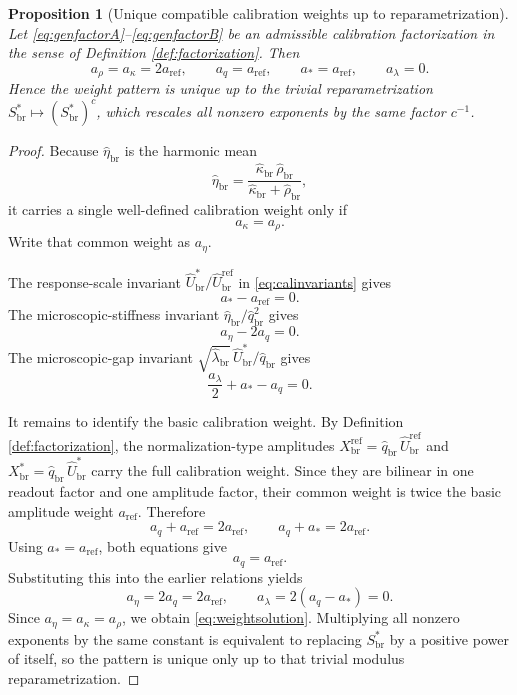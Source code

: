 \documentclass[11pt]{article}
\newcommand{\RespMicroRef}{X_{\mathrm{br}}^{\mathrm{ref}}}
\newcommand{\RespMicroEq}{X_{\mathrm{br}}^{\ast}}
\newcommand{\RespScaleEq}{S_{\mathrm{br}}^{\ast}}
\newcommand{\RespRawReadout}{\widehat q_{\mathrm{br}}}
\newcommand{\RespRawRef}{\widehat U_{\mathrm{br}}^{\mathrm{ref}}}
\newcommand{\RespRawCov}{\widehat\kappa_{\mathrm{br}}}
\newcommand{\RespRawRelax}{\widehat\rho_{\mathrm{br}}}
\newcommand{\RespRawWell}{\widehat\lambda_{\mathrm{br}}}
\newcommand{\RespRawEq}{\widehat U_{\mathrm{br}}^{\ast}}
\newcommand{\RespRawIso}{\widehat\eta_{\mathrm{br}}}
\newtheorem{proposition}{Proposition}
\begin{document}
\begin{proposition}[Unique compatible calibration weights up to reparametrization]
\label{prop:weights}
Let \eqref{eq:genfactorA}--\eqref{eq:genfactorB} be an admissible calibration factorization in the sense of Definition \ref{def:factorization}. Then
\begin{equation}
a_\rho=a_\kappa=2a_{\mathrm{ref}},
\qquad
a_q=a_{\mathrm{ref}},
\qquad
a_\ast=a_{\mathrm{ref}},
\qquad
a_\lambda=0.
\label{eq:weightsolution}
\end{equation}
Hence the weight pattern is unique up to the trivial reparametrization \(\RespScaleEq\mapsto(\RespScaleEq)^c\), which rescales all nonzero exponents by the same factor \(c^{-1}\).
\end{proposition}

\begin{proof}
Because \(\RespRawIso\) is the harmonic mean
\[
\RespRawIso=\frac{\RespRawCov\,\RespRawRelax}{\RespRawCov+\RespRawRelax},
\]
it carries a single well-defined calibration weight only if
\[
a_\kappa=a_\rho.
\]
Write that common weight as \(a_\eta\).

The response-scale invariant \(\RespRawEq/\RespRawRef\) in \eqref{eq:calinvariants} gives
\[
a_\ast-a_{\mathrm{ref}}=0.
\]
The microscopic-stiffness invariant \(\RespRawIso/\RespRawReadout^2\) gives
\[
a_\eta-2a_q=0.
\]
The microscopic-gap invariant \(\sqrt{\RespRawWell}\,\RespRawEq/\RespRawReadout\) gives
\[
\frac{a_\lambda}{2}+a_\ast-a_q=0.
\]

It remains to identify the basic calibration weight. By Definition \ref{def:factorization}, the normalization-type amplitudes \(\RespMicroRef=\RespRawReadout\,\RespRawRef\) and \(\RespMicroEq=\RespRawReadout\,\RespRawEq\) carry the full calibration weight. Since they are bilinear in one readout factor and one amplitude factor, their common weight is twice the basic amplitude weight \(a_{\mathrm{ref}}\). Therefore
\[
a_q+a_{\mathrm{ref}}=2a_{\mathrm{ref}},
\qquad
a_q+a_\ast=2a_{\mathrm{ref}}.
\]
Using \(a_\ast=a_{\mathrm{ref}}\), both equations give
\[
a_q=a_{\mathrm{ref}}.
\]
Substituting this into the earlier relations yields
\[
a_\eta=2a_q=2a_{\mathrm{ref}},
\qquad
a_\lambda=2(a_q-a_\ast)=0.
\]
Since \(a_\eta=a_\kappa=a_\rho\), we obtain \eqref{eq:weightsolution}. Multiplying all nonzero exponents by the same constant is equivalent to replacing \(\RespScaleEq\) by a positive power of itself, so the pattern is unique only up to that trivial modulus reparametrization.
\end{proof}
\end{document}
